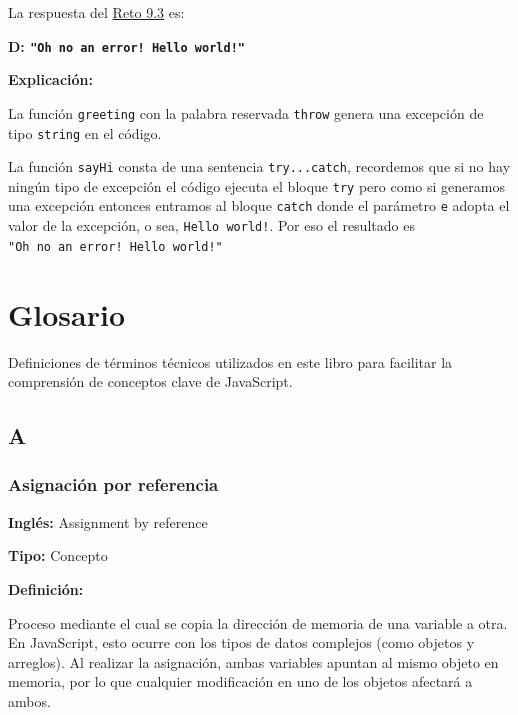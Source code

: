 \documentclass[
  letterpaper,
  DIV=11,
  numbers=noendperiod]{scrreprt}
\let\oldsubsection\subsection
\renewcommand{\subsection}{\phantomsection\oldsubsection}
\begin{document}
La respuesta del \hyperref[sec-cap9-reto3]{Reto 9.3} es:

\textbf{D: \texttt{"Oh\ no\ an\ error!\ Hello\ world!"}}

\textbf{Explicación:}

La función \texttt{greeting} con la palabra reservada \texttt{throw}
genera una excepción de tipo \texttt{string} en el código.

La función \texttt{sayHi} consta de una sentencia \texttt{try...catch},
recordemos que si no hay ningún tipo de excepción el código ejecuta el
bloque \texttt{try} pero como si generamos una excepción entonces
entramos al bloque \texttt{catch} donde el parámetro \texttt{e} adopta
el valor de la excepción, o sea, \texttt{Hello\ world!}. Por eso el
resultado es \texttt{"Oh\ no\ an\ error!\ Hello\ world!"}


\chapter*{Glosario}\label{glosario}


Definiciones de términos técnicos utilizados en este libro para
facilitar la comprensión de conceptos clave de JavaScript.

\section*{A}\label{a}


\subsection*{Asignación por
referencia}\label{glos-asignacion_por_referencia}

\textbf{Inglés:} Assignment by reference

\textbf{Tipo:} Concepto

\textbf{Definición:}

Proceso mediante el cual se copia la dirección de memoria de una
variable a otra. En JavaScript, esto ocurre con los tipos de datos
complejos (como objetos y arreglos). Al realizar la asignación, ambas
variables apuntan al mismo objeto en memoria, por lo que cualquier
modificación en uno de los objetos afectará a ambos.
\end{document}
